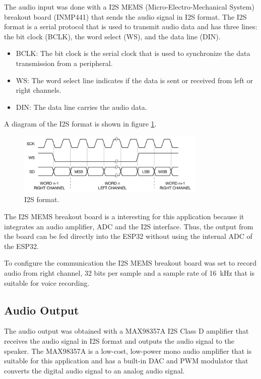 The audio input was done with a I2S MEMS (Micro-Electro-Mechanical System) breakout board (INMP441) that sends the audio signal in I2S format. The I2S format is a serial protocol that is used to transmit audio data and has three lines: the bit clock (BCLK), the word select (WS), and the data line (DIN). 
\begin{itemize}
    \item BCLK: The bit clock is the serial clock that is used to synchronize the data transmission from a peripheral.
    \item WS: The word select line indicates if the data is sent or received from left or right channels.
    \item DIN: The data line carries the audio data.
\end{itemize}

A diagram of the I2S format is shown in figure \ref{fig:I2S}.

\begin{figure}[H]
    \centering
    \includegraphics[width=0.8\textwidth]{Images/i2s.png}
    \caption{I2S format.}
    \label{fig:I2S}
\end{figure}

The I2S MEMS breakout board is a interesting for this application because it integrates an audio amplifier, ADC and the I2S interface. Thus, the output from the board can be fed directly into the ESP32 without using the internal ADC of the ESP32.

To configure the communication the I2S MEMS breakout board was set to record audio from right channel, 32 bits per sample and a sample rate of \SI{16}{\kilo \hertz} that is suitable for voice recording. 

\subsection{Audio Output}

The audio output was obtained with a MAX98357A I2S Class D amplifier that receives the audio signal in I2S format and outputs the audio signal to the speaker. The MAX98357A is a low-cost, low-power mono audio amplifier that is suitable for this application and has a built-in DAC and PWM modulator that converts the digital audio signal to an analog audio signal. 

